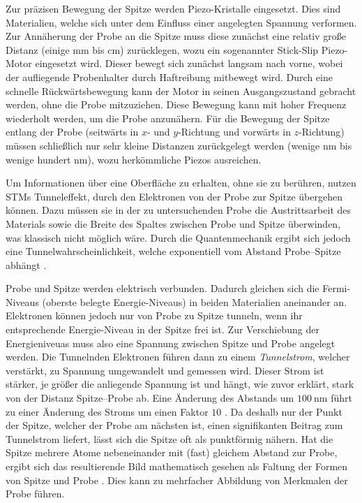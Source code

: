 \documentclass{article}
\newcommand{\defc}{black}
\newcommand{\colorT}[2][blue]{\color{#1}{#2}\color{\defc}}
\newcommand{\todo}[1]{\colorT[red]{\textbf{(#1)}}}
\begin{document}
Zur präzisen Bewegung der Spitze werden Piezo-Kristalle eingesetzt. 
Dies sind Materialien, welche sich unter dem Einfluss einer angelegten Spannung
verformen. Zur Annäherung der Probe an die Spitze muss diese zunächst eine relativ 
große Distanz (einige \si{\mm} bis \si{cm}) zurücklegen, wozu ein sogenannter Stick-Slip
Piezo-Motor eingesetzt wird. Dieser bewegt sich zunächst langsam nach vorne, wobei
der aufliegende Probenhalter durch Haftreibung mitbewegt wird. Durch eine schnelle
Rückwärtsbewegung kann der Motor in seinen Ausgangszustand gebracht werden, ohne die
Probe mitzuziehen. Diese Bewegung kann mit hoher Frequenz wiederholt werden, um die Probe anzunähern.
Für die Bewegung der Spitze entlang der Probe (seitwärts in $x$- und $y$-Richtung und
vorwärts in $z$-Richtung) müssen schließlich nur sehr kleine Distanzen zurückgelegt
werden (wenige \si{nm} bis wenige hundert \si{\nm}), wozu herkömmliche Piezos ausreichen.

Um Informationen über eine Oberfläche zu erhalten, ohne sie zu berühren, nutzen STMs
Tunneleffekt, durch den Elektronen von der Probe zur Spitze übergehen können.
Dazu müssen sie in der zu untersuchenden Probe die Austrittsarbeit des Materials 
sowie  die Breite des Spaltes zwischen Probe und Spitze überwinden,
was klassisch nicht möglich wäre. Durch die Quantenmechanik ergibt sich jedoch eine
Tunnelwahrscheinlichkeit, welche exponentiell vom Abstand Probe--Spitze abhängt \todo{Quelle}.

Probe und Spitze werden elektrisch verbunden. Dadurch gleichen sich die Fermi-Niveaus (oberste belegte Energie-Niveaus) in beiden Materialien aneinander an.
Elektronen können jedoch nur von Probe zu Spitze tunneln, wenn ihr entsprechende Energie-Niveau
in der Spitze frei ist. Zur Verschiebung der Energieniveuas muss also eine Spannung zwischen Spitze und Probe angelegt werden.
Die Tunnelnden Elektronen führen dann zu einem \textit{Tunnelstrom}, welcher verstärkt,
zu Spannung umgewandelt und gemessen wird. Dieser Strom ist stärker, je größer die
anliegende Spannung ist und hängt,
wie zuvor erklärt, stark von der Distanz Spitze--Probe ab. Eine Änderung des Abstands
um $\SI{100}{\nm}$ führt zu einer Änderung des Stroms um einen Faktor $10$ \cite{wiki-stm} \todo{Quelle oder rausnehmen}.
Da deshalb nur der Punkt der Spitze, welcher der Probe am nächsten ist, einen signifikanten Beitrag zum Tunnelstrom liefert, lässt sich die Spitze oft als punktförmig nähern.
Hat die Spitze mehrere Atome nebeneinander mit (fast) gleichem Abstand zur Probe,
ergibt sich das resultierende Bild mathematisch gesehen als Faltung der Formen
von Spitze und Probe \cite{Anleitung}. Dies kann zu mehrfacher Abbildung von 
Merkmalen der Probe führen.
\end{document}
